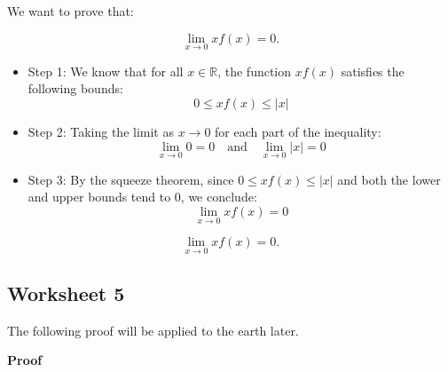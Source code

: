 \documentclass{article}
\begin{document}
We want to prove that:

\[
\lim_{x \to 0} x f(x) = 0.
\]

\begin{itemize}
    \item Step 1: We know that for all $x \in \mathbb{R}$, the function $x f(x)$ satisfies the following bounds:
    \[
    0 \leq x f(x) \leq |x|
    \]
    \item Step 2: Taking the limit as $x \to 0$ for each part of the inequality:
    \[
    \lim_{x \to 0} 0 = 0 \quad \text{and} \quad \lim_{x \to 0} |x| = 0
    \]
    \item Step 3: By the squeeze theorem, since $0 \leq x f(x) \leq |x|$ and both the lower and upper bounds tend to 0, we conclude:
    \[
    \lim_{x \to 0} x f(x) = 0
    \]
\end{itemize}


\[
\lim_{x \to 0} x f(x) = 0.
\]


\subsection*{Worksheet 5}

The following proof will be applied to the earth later.

\textbf{Proof}
\end{document}
